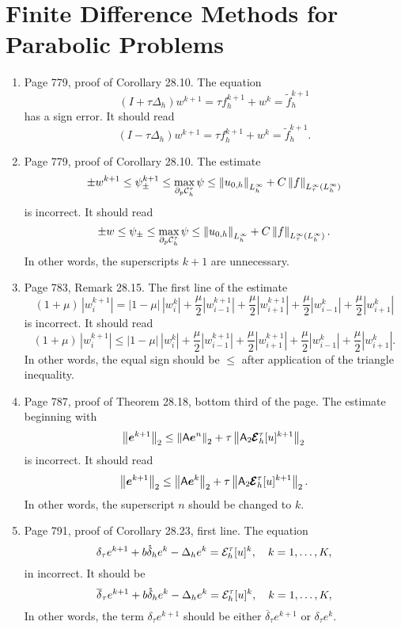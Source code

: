\documentclass{book}
\begin{document}
	
	\setcounter{chapter}{27}
	
\chapter{Finite Difference Methods for Parabolic Problems}
	
	\begin{enumerate}
	\item
Page 779, proof of Corollary 28.10. The equation 
	\[
(I+\tau\Delta_h) w^{k+1} = \tau f_h^{k+1} + w^k = \tilde{f}_h^{k+1}
	\]
has a sign error. It should read
	\[
(I-\tau\Delta_h) w^{k+1} = \tau f_h^{k+1} + w^k = \tilde{f}_h^{k+1}.
	\]
	
	\item
Page 779, proof of Corollary 28.10. The estimate
	\[
\pm w^{k+1} \le \psi_{\pm}^{k+1} \le \max_{\partial_p \mathcal{C}_h^\tau} \psi \le \left\| u_{0,h} \right\|_{L_h^\infty} + C\left\| f \right\|_{L_\tau^\infty(L_h^\infty)}
	\]	
is incorrect. It should read 
	\[
\pm w \le \psi_{\pm} \le \max_{\partial_p \mathcal{C}_h^\tau} \psi \le \left\| u_{0,h} \right\|_{L_h^\infty} + C\left\| f \right\|_{L_\tau^\infty(L_h^\infty)}.
	\]	
In other words, the superscripts ${k+1}$ are unnecessary.

	\item
Page 783, Remark 28.15. The first line of the estimate 
	\[
(1+\mu) \, |w_i^{k+1}| = |1-\mu| \, |w_i^k| + \frac{\mu}{2} | w_{i-1}^{k+1}| + \frac{\mu}{2} |w_{i+1}^{k+1}| + \frac{\mu}{2} | w_{i-1}^k| + \frac{\mu}{2} |w_{i+1}^k| 	
	\]
is incorrect. It should read 
	\[
(1+\mu) \, |w_i^{k+1}| \le  |1-\mu| \, |w_i^k| + \frac{\mu}{2} | w_{i-1}^{k+1}| + \frac{\mu}{2} |w_{i+1}^{k+1}| + \frac{\mu}{2} | w_{i-1}^k| + \frac{\mu}{2} |w_{i+1}^k| 	.
	\]
In other words, the equal sign should be $\le$ after application of the triangle inequality.


	\item
Page 787, proof of Theorem 28.18, bottom third of the page. The estimate beginning with 
	\[
\left\| \boldsymbol{e}^{k+1} \right\|_2 \le \left\| \mathsf{A}\boldsymbol{e}^n \right\|_2 +\tau \left\| \mathsf{A}_2\pmb{\mathcal{E}}_h^\tau[u]^{k+1} \right\|_2
	\]
is incorrect. It should read
	\[
\left\| \boldsymbol{e}^{k+1} \right\|_2 \le \left\| \mathsf{A}\boldsymbol{e}^k \right\|_2 +\tau \left\| \mathsf{A}_2\pmb{\mathcal{E}}_h^\tau[u]^{k+1} \right\|_2.
	\]
In other words, the superscript $n$ should be changed to $k$.

	\item
Page 791, proof of Corollary 28.23, first line. The equation
	\[
\delta_\tau e^{k+1} + b \mathring\delta_h e^k - \Delta_h e^k = {\mathcal E}_h^\tau[u]^k, \quad k = 1, \ldots, K,
	\]
in incorrect. It should be
	\[
\overline{\delta}_\tau e^{k+1} + b \mathring\delta_h e^k - \Delta_h e^k = {\mathcal E}_h^\tau[u]^k, \quad k = 1, \ldots, K,
	\]
In other words, the term $\delta_\tau e^{k+1}$ should be either $\overline\delta_\tau e^{k+1}$ or $\delta_\tau e^k$.
	
	\end{enumerate}
	
\end{document}
